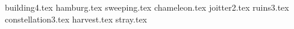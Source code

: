 \documentclass[11pt,a4paper,oneside,arabic,korean]{article}
\begin{document}
	


	{building4.tex}
	{hamburg.tex}
	{sweeping.tex}
	{chameleon.tex}
	{joitter2.tex}
	{ruins3.tex}
	{constellation3.tex}
	{harvest.tex}
	{stray.tex}
	
	
\end{document}
